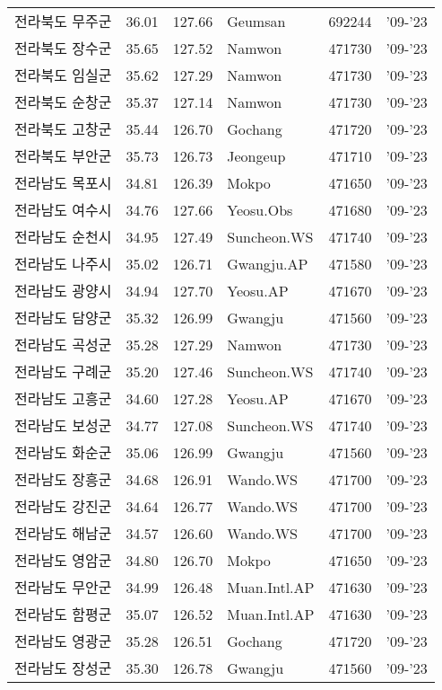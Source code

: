 \begin{longtable}{lcclcc}
  전라북도 무주군 & 36.01 & 127.66 & Geumsan & 692244 & '09-'23 \\
  전라북도 장수군 & 35.65 & 127.52 & Namwon & 471730 & '09-'23 \\
  전라북도 임실군 & 35.62 & 127.29 & Namwon & 471730 & '09-'23 \\
  전라북도 순창군 & 35.37 & 127.14 & Namwon & 471730 & '09-'23 \\
  전라북도 고창군 & 35.44 & 126.70 & Gochang & 471720 & '09-'23 \\
  전라북도 부안군 & 35.73 & 126.73 & Jeongeup & 471710 & '09-'23 \\
  전라남도 목포시 & 34.81 & 126.39 & Mokpo & 471650 & '09-'23 \\
  전라남도 여수시 & 34.76 & 127.66 & Yeosu.Obs & 471680 & '09-'23 \\
  전라남도 순천시 & 34.95 & 127.49 & Suncheon.WS & 471740 & '09-'23 \\
  전라남도 나주시 & 35.02 & 126.71 & Gwangju.AP & 471580 & '09-'23 \\
  전라남도 광양시 & 34.94 & 127.70 & Yeosu.AP & 471670 & '09-'23 \\
  전라남도 담양군 & 35.32 & 126.99 & Gwangju & 471560 & '09-'23 \\
  전라남도 곡성군 & 35.28 & 127.29 & Namwon & 471730 & '09-'23 \\
  전라남도 구례군 & 35.20 & 127.46 & Suncheon.WS & 471740 & '09-'23 \\
  전라남도 고흥군 & 34.60 & 127.28 & Yeosu.AP & 471670 & '09-'23 \\
  전라남도 보성군 & 34.77 & 127.08 & Suncheon.WS & 471740 & '09-'23 \\
  전라남도 화순군 & 35.06 & 126.99 & Gwangju & 471560 & '09-'23 \\
  전라남도 장흥군 & 34.68 & 126.91 & Wando.WS & 471700 & '09-'23 \\
  전라남도 강진군 & 34.64 & 126.77 & Wando.WS & 471700 & '09-'23 \\
  전라남도 해남군 & 34.57 & 126.60 & Wando.WS & 471700 & '09-'23 \\
  전라남도 영암군 & 34.80 & 126.70 & Mokpo & 471650 & '09-'23 \\
  전라남도 무안군 & 34.99 & 126.48 & Muan.Intl.AP & 471630 & '09-'23 \\
  전라남도 함평군 & 35.07 & 126.52 & Muan.Intl.AP & 471630 & '09-'23 \\
  전라남도 영광군 & 35.28 & 126.51 & Gochang & 471720 & '09-'23 \\
  전라남도 장성군 & 35.30 & 126.78 & Gwangju & 471560 & '09-'23 \\

\end{longtable}
